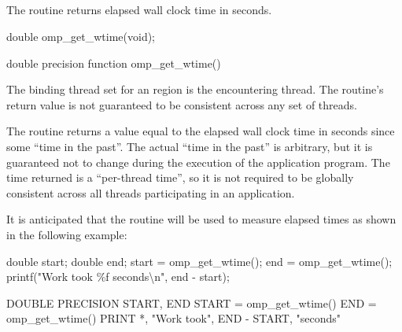 \subsection{}
\label{subsec:omp_get_wtime}
\summary
The  routine returns elapsed wall clock time in seconds.

\format
\begin{ccppspecific}
\begin{boxedcode}
double omp\_get\_wtime(void);
\end{boxedcode}
\end{ccppspecific}

\begin{fortranspecific}
\begin{boxedcode}
double precision function omp\_get\_wtime()
\end{boxedcode}
\end{fortranspecific}

\binding
The binding thread set for an  region is the encountering thread. The 
routine’s return value is not guaranteed to be consistent across any set of threads.

\effect
The  routine returns a value equal to the elapsed wall clock time in 
seconds since some ``time in the past''. The actual ``time in the past'' is arbitrary, but it is 
guaranteed not to change during the execution of the application program. The time 
returned is a ``per-thread time'', so it is not required to be globally consistent across all 
threads participating in an application.

\begin{note}
It is anticipated that the routine will be used to measure elapsed times as shown 
in the following example:

\begin{ccppspecific}
\begin{boxedcode}
double start;
double end;
start = omp\_get\_wtime();
end = omp\_get\_wtime();
printf("Work took \%f seconds{\textbackslash}n", end - start);
\end{boxedcode}
\end{ccppspecific}

\begin{fortranspecific}
\begin{boxedcode}
DOUBLE PRECISION START, END
START = omp\_get\_wtime()
END = omp\_get\_wtime()
PRINT *, "Work took", END - START, "seconds"
\end{boxedcode}
\end{fortranspecific}
\end{note}










